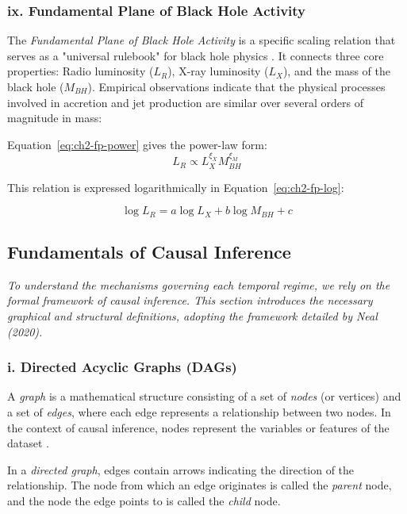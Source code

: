 \subsubsection*{ix. Fundamental Plane of Black Hole Activity}

The \textit{Fundamental Plane of Black Hole Activity} is a specific scaling relation that serves as a "universal rulebook" for black hole physics \cite{merloni2003}. It connects three core properties: Radio luminosity ($L_R$), X-ray luminosity ($L_X$), and the mass of the black hole ($M_{BH}$). Empirical observations indicate that the physical processes involved in accretion and jet production are similar over several orders of magnitude in mass:

Equation~\eqref{eq:ch2-fp-power} gives the power-law form:
\begin{equation}
    \label{eq:ch2-fp-power}
    L_R \propto L_X^{\xi_X} M_{BH}^{\xi_M}
\end{equation}

This relation is expressed logarithmically in Equation~\eqref{eq:ch2-fp-log}:

\begin{equation}
    \label{eq:ch2-fp-log}
    \log L_R = a \log L_X + b \log M_{BH} + c
\end{equation}

\subsection{Fundamentals of Causal Inference}

\textit{To understand the mechanisms governing each temporal regime, we rely on the formal framework of causal inference. This section introduces the necessary graphical and structural definitions, adopting the framework detailed by Neal (2020).}

\subsubsection*{i. Directed Acyclic Graphs (DAGs)}

A \textit{graph} is a mathematical structure consisting of a set of \textit{nodes} (or vertices) and a set of \textit{edges}, where each edge represents a relationship between two nodes. In the context of causal inference, nodes represent the variables or features of the dataset \cite{neal2020}.

In a \textit{directed graph}, edges contain arrows indicating the direction of the relationship. The node from which an edge originates is called the \textit{parent} node, and the node the edge points to is called the \textit{child} node. 

